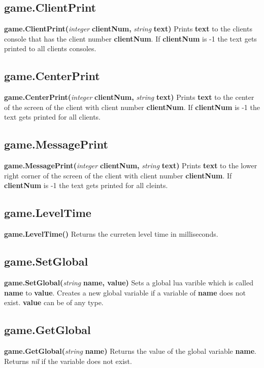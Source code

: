 \documentclass{scrreprt}
\begin{document}
\subsection{game.ClientPrint}
\label{g-clientprint}
\textbf{game.ClientPrint(}\textit{integer}\textbf{ clientNum, }\textit{string}\textbf{ text)}
\newline
Prints \textbf{text} to the clients console that has the client number \textbf{clientNum}. If \textbf{clientNum} is -1 the text gets printed to all clients consoles.
\subsection{game.CenterPrint}
\label{g-centerprint}
\textbf{game.CenterPrint(}\textit{integer}\textbf{ clientNum, }\textit{string}\textbf{ text)}
\newline
Prints \textbf{text} to the center of the screen of the client with client number \textbf{clientNum}. If \textbf{clientNum} is -1 the text gets printed for all clients.
\subsection{game.MessagePrint}
\label{g-messagepritn}
\textbf{game.MessagePrint(}\textit{integer}\textbf{ clientNum, }\textit{string}\textbf{ text)}
\newline
Prints \textbf{text} to the lower right corner of the screen of the client with client number \textbf{clientNum}. If \textbf{clientNum} is -1 the text gets printed for all cleints.
\subsection{game.LevelTime}
\label{g-leveltime}
\textbf{game.LevelTime()}
Returns the curreten level time in milliseconds.
\subsection{game.SetGlobal}
\label{g-setglobal}
\textbf{game.SetGlobal(}\textit{string}\textbf{ name, value)}
\newline
Sets a global lua varible which is called \textbf{name} to \textbf{value}. Creates a new global variable if a variable of \textbf{name} does not exist. \textbf{value} can be of any type.
\subsection{game.GetGlobal}
\label{g-getglobal}
\textbf{game.GetGlobal(}\textit{string}\textbf{ name)}
\newline
Returns the value of the global variable \textbf{name}. Returns \textit{nil} if the variable does not exist.
\newpage
\end{document}
